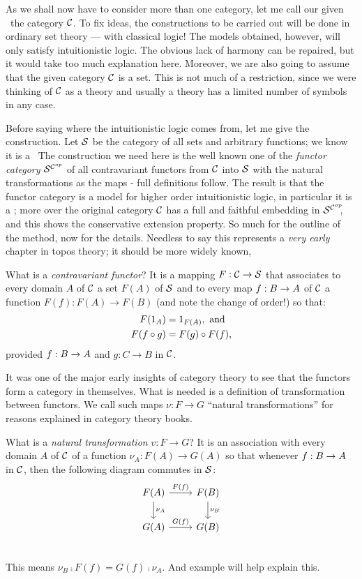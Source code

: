 As we shall now have to consider more than one category, let me call our given \ccc\ the category $\C$. To fix ideas, the constructions to be carried out will be done in ordinary set theory --- with classical logic! The models obtained, however, will only satisfy intuitionistic logic. The obvious lack of harmony can be repaired, but it would take too much explanation here.	Moreover, we are also going to assume that the given category $\C$ is a set. This is not much of a restriction, since we were thinking of $\C$ as a theory and usually a theory has a limited number of symbols in any case.

Before saying where the intuitionistic logic comes from, let me give the construction. Let $\S$ be the category of all sets and arbitrary functions; we know it is a \ccc\  The construction we need here is the well known one of the {\it functor category} $\scop$ of all contravariant functors from $\C$ into $\S$ with the natural transformations as the maps - full definitions follow. The result is that the functor category is a model for higher order intuitionistic logic, in particular it is a \ccc; more over the original category $\C$ has a full and faithful embedding in $\scop\!\!$, and this shows the conservative extension property. So much for the outline of the method, now for the details. Needless to say this represents a {\it very early} chapter in topos theory; it should be more widely known,

What is a {\it contravariant functor}? It is a mapping $F: \C\to \S$ that associates to every domain $A$ of $\C$ a set $F(A)$ of $\S$ and to every map $f: \BA$ of $\C$ a function $F(f) : F(A) \to F(B)$ (and note the change of order!) so that:
\begin{align*}
F(\id_A) &= \id_{F(A)} , {\textrm{ and}}\\
F(f \comp g) &= F(g) \comp F(f),
\end{align*}
%
provided $f: \BA$ and $g: C \to B$ in $\C$.

It was one of the major early insights of category theory to see that the functors form
a category in themselves. What is needed is a definition of transformation between functors. We call such maps $\nu : F \to G$ ``natural transformations'' for reasons explained in category theory books. 

What is a {\it natural transformation} $v : F\to G$? It is an association with every domain $A$ of $\C$ of a function $\nu_A: F(A)\to G(A)$ so that whenever $f : \BA$ in $\C$, then the following diagram commutes in $\S$:
\[
  \begin{tikzcd}
    F(A) \arrow{d}{\nu_A} \arrow{r}{F(f)}  & F(B) \arrow{d}{\nu_B} \\
    G(A)  \arrow{r}{G(f)} & G(B)\\
  \end{tikzcd}
\]
This means $\nu_B \comp F(f) = G(f) \comp \nu_A$. And example will help explain this.

